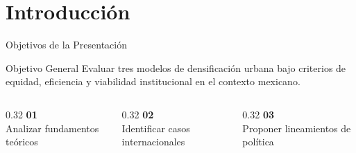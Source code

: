 
\section{Introducción}


\begin{frame}{Objetivos de la Presentación}
  \begin{block}{Objetivo General}
    Evaluar tres modelos de densificación urbana bajo criterios de equidad,
    eficiencia y viabilidad institucional en el contexto mexicano.
  \end{block}
  \vspace{0.4cm}
  \begin{columns}[T]
    \begin{column}{0.32\textwidth}
      \centering
      {\color{ColorPrincipal}\Large\textbf{01}}\\[0.1cm]
      {\small Analizar fundamentos teóricos}
    \end{column}
    \begin{column}{0.32\textwidth}
      \centering
      {\color{ColorPrincipal}\Large\textbf{02}}\\[0.1cm]
      {\small Identificar casos internacionales}
    \end{column}
    \begin{column}{0.32\textwidth}
      \centering
      {\color{ColorPrincipal}\Large\textbf{03}}\\[0.1cm]
      {\small Proponer lineamientos de política}
    \end{column}
  \end{columns}
\end{frame}
